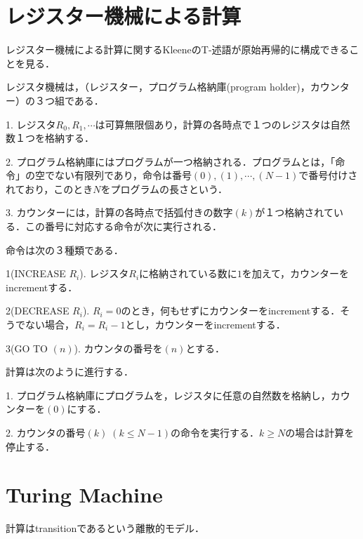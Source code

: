 \documentclass[uplatex, 12pt, dvipdfmx]{jsreport}
\begin{document}
\section{レジスター機械による計算}
レジスター機械による計算に関するKleeneのT-述語が原始再帰的に構成できることを見る．
\begin{screen}
\begin{definition}[レジスタ機械]
    レジスタ機械は，（レジスター，プログラム格納庫(program holder)，カウンター）の３つ組である．

    1. レジスタ$R_0, R_1, \cdots$は可算無限個あり，計算の各時点で１つのレジスタは自然数１つを格納する．

    2. プログラム格納庫にはプログラムが一つ格納される．プログラムとは，「命令」の空でない有限列であり，命令は番号$(0),(1),\cdots, (N-1)$で番号付けされており，このとき$N$をプログラムの長さという．

    3. カウンターには，計算の各時点で括弧付きの数字$(k)$が１つ格納されている．この番号に対応する命令が次に実行される．
\end{definition}
\begin{definition}[命令]
    命令は次の３種類である．

    1(INCREASE $R_i$). レジスタ$R_i$に格納されている数に$1$を加えて，カウンターをincrementする．

    2(DECREASE $R_i$). $R_i=0$のとき，何もせずにカウンターをincrementする．そうでない場合，$R_i=R_i-1$とし，カウンターをincrementする．

    3(GO TO $(n)$). カウンタの番号を$(n)$とする．
\end{definition}

計算は次のように進行する．

1. プログラム格納庫にプログラムを，レジスタに任意の自然数を格納し，カウンターを$(0)$にする．

2. カウンタの番号$(k)\; (k\le N-1)$の命令を実行する．$k\ge N$の場合は計算を停止する．
\end{screen}

\begin{definition}[プログラムが計算する部分関数]
    
\end{definition}

\section{Turing Machine}
計算はtransitionであるという離散的モデル．
\end{document}
